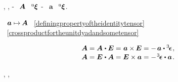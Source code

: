 %
,
,
\dotproductinquotes\hbox{-}
~${\hspace{-0.2ex}\bm{A}}$
~${\hspace{-0.2ex}{^\mathrm{n}\hspace{-0.12ex}\bm{\xi}}}$
\crossproductinquotes\hbox{-}
~$\bm{a}$
~${\hspace{-0.2ex}{^\mathrm{n}\hspace{-0.12ex}\bm{\xi}}}$.

~${\bm{a} \mapsto \hspace{-0.2ex} \bm{A}}$
~\eqref{definingpropertyoftheidentitytensor}
~\eqref{crossproductfortheunitdyadandsometensor}

\nopagebreak\vspace{-0.1em}
\begin{equation}\label{skewsymmetricbivalentfromvector}
\begin{array}{c}
\bm{A} = \bm{A} \hspace{.1ex} \dotp \UnitDyad = \hspace{.1ex} \bm{a} \times \hspace{-0.1ex} \UnitDyad = - \hspace{.3ex} \bm{a} \dotp \permutationsparitytensor
\hspace{.1ex} ,
\\[.1em]
\bm{A} = \UnitDyad \hspace{.1ex} \dotp \bm{A} = \UnitDyad \times \bm{a} = - \hspace{.2ex} \permutationsparitytensor \dotp \bm{a}
\hspace{.2ex} .
\end{array}
\end{equation}

\noindent
{},
,

